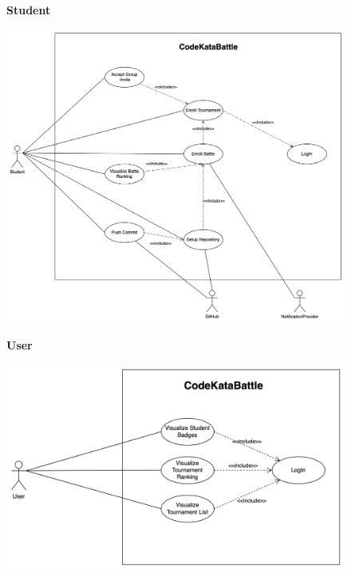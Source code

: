 \documentclass{Configuration_Files/Template}
\begin{document}
\begin{figure}[H]
\textbf{Student}\par\medskip
\includegraphics[scale = 0.45]{Images/UseCaseDiagrams/StudentUseCaseDiagram.png}\\
\centering
\end{figure}
\begin{figure}[H]
\textbf{User}\par\medskip
\includegraphics[scale = 0.45]{Images/UseCaseDiagrams/UserUseCaseDiagram.png}\\
\centering
\end{figure}
\end{document}
